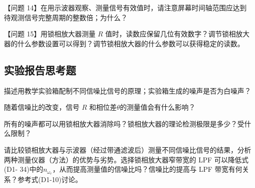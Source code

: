 \documentclass[dvipsnames, svgnames,a4paper,11pt]{article}
\begin{document}
		【问题 14】在用示波器观察、测量信号有效值时，请注意屏幕时间轴范围应达到待观测信号完整周期的整数倍；为什么？


		【问题 15】用锁相放大器测量 $R$ 值时，读数应保留几位有效数字？调节锁相放大器的什么参数设置可以得到？调节锁相放大器的什么参数可以获得稳定的读数。


\subsection{实验报告思考题}


\begin{question}
	描述用教学实验箱配制不同信噪比信号的原理；实验箱生成的噪声是否为白噪声？
\end{question}










\begin{question}
	随着信噪比的改变，信号 $R$ 和相位差$\theta$的测量值会有什么影响？
\end{question}





\begin{question}
	所有的噪声都可以用锁相放大器消除吗？锁相放大器的理论检测极限是多少？受什么限制？
\end{question}




\begin{question}
	请比较锁相放大器与示波器（经过带通滤波后）测量不同信噪比信号的结果，分析两种测量仪器（方法）的优势与劣势。选择锁相放大器窄带宽的 LPF 可以降低式(D1- 34)中的$n_{\omega_r}$，从而提高测量值的信噪比吗？信噪比的提高与 LPF 带宽有何关系？参考式(D1-10)讨论。
\end{question}
\end{document}
